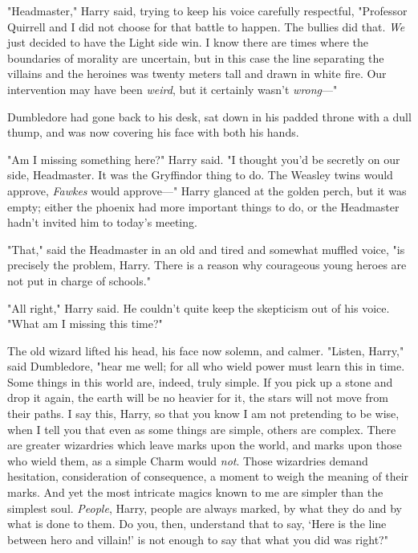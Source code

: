 "Headmaster," Harry said, trying to keep his voice carefully respectful,
"Professor Quirrell and I did not choose for that battle to happen. The bullies
did that. \emph{We} just decided to have the Light side win. I know there are
times where the boundaries of morality are uncertain, but in this case the line
separating the villains and the heroines was twenty meters tall and drawn in
white fire. Our intervention may have been \emph{weird}, but it certainly
wasn't \emph{wrong}\mbox{---}"

Dumbledore had gone back to his desk, sat down in his padded throne with a dull
thump, and was now covering his face with both his hands.

"Am I missing something here?" Harry said. "I thought you'd be secretly on our
side, Headmaster. It was the Gryffindor thing to do. The Weasley twins would
approve, \emph{Fawkes} would approve\mbox{---}" Harry glanced at the golden perch, but
it was empty; either the phoenix had more important things to do, or the
Headmaster hadn't invited him to today's meeting.

"That," said the Headmaster in an old and tired and somewhat muffled voice, "is
precisely the problem, Harry. There is a reason why courageous young heroes are
not put in charge of schools."

"All right," Harry said. He couldn't quite keep the skepticism out of his
voice. "What am I missing this time?"

The old wizard lifted his head, his face now solemn, and calmer. "Listen,
Harry," said Dumbledore, "hear me well; for all who wield power must learn this
in time. Some things in this world are, indeed, truly simple. If you pick up a
stone and drop it again, the earth will be no heavier for it, the stars will
not move from their paths. I say this, Harry, so that you know I am not
pretending to be wise, when I tell you that even as some things are simple,
others are complex. There are greater wizardries which leave marks upon the
world, and marks upon those who wield them, as a simple Charm would \emph{not}.
Those wizardries demand hesitation, consideration of consequence, a moment to
weigh the meaning of their marks. And yet the most intricate magics known to me
are simpler than the simplest soul. \emph{People}, Harry, people are always
marked, by what they do and by what is done to them. Do you, then, understand
that to say, `Here is the line between hero and villain!' is not enough to say
that what you did was right?"

